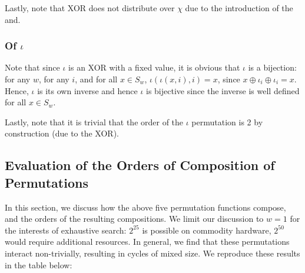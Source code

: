\documentclass[10pt,twocolumn,twoside]{pnas-new}
\begin{document}
Lastly, note that XOR does not distribute over $\chi$ due to the
introduction of the and.

\subsubsection{Of $\iota$} \label{sec:p:i}


Note that since $\iota$ is an XOR with a fixed value, it is obvious that
$\iota$ is a bijection: for any $w$, for any $i$, and for all $x \in S_{w}$,
$\iota(\iota(x, i), i) = x$, since $x \oplus \iota_{i} \oplus \iota_{i} = x$.
Hence, $\iota$ is its own inverse and hence $\iota$ is bijective since the
inverse is well defined for all $x \in S_{w}$.

Lastly, note that it is trivial that the order of the $\iota$ permutation is
2 by construction (due to the XOR).

\subsection{Evaluation of the Orders of Composition of Permutations} \label{sec:p:composition}

In this section, we discuss how the above five permutation functions compose,
and the orders of the resulting compositions. We limit our discussion to $w=1$
for the interests of exhaustive search: $2^{25}$ is possible on commodity
hardware, $2^{50}$ would require additional resources. In general, we find that
these permutations interact non-trivially, resulting in cycles of mixed size.
We reproduce these results in the table below:
\end{document}
